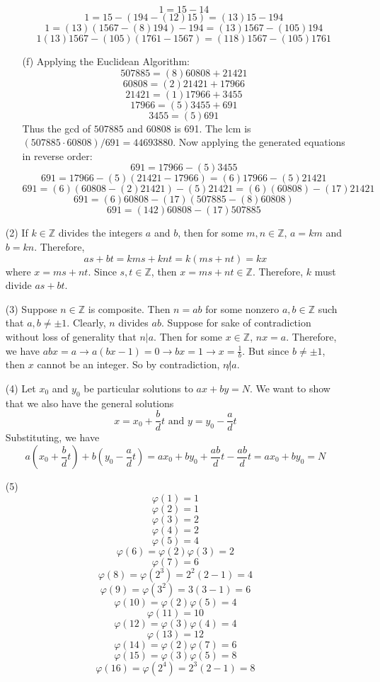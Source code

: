 \documentclass[12pt]{article}
\begin{document}
\begin{itemize}
\begin{itemize}
$$1 = 15 - 14$$
$$1 = 15 - (194 - (12)15) = (13)15 - 194$$
$$1 = (13)(1567 - (8)194) - 194 = (13)1567 - (105)194$$
$$1  (13)1567 - (105)(1761 - 1567) = (118)1567 - (105)1761$$
\item[(f)] Applying the Euclidean Algorithm:
$$507885 = (8)60808 + 21421$$
$$60808 = (2)21421 + 17966$$
$$21421 = (1)17966 + 3455$$
$$17966 = (5)3455 + 691$$
$$3455 = (5)691$$
Thus the gcd of $507885$ and $60808$ is 691. The lcm is $(507885 \cdot 60808) / 691 = 44693880$. Now applying the generated equations in reverse order:
$$691 = 17966 - (5)3455$$
$$691 = 17966 - (5)(21421 - 17966) = (6)17966 - (5)21421$$
$$691 = (6)(60808 - (2)21421) - (5)21421 = (6)(60808) - (17)21421$$
$$691 = (6)60808 - (17)(507885 - (8)60808)$$
$$691 = (142)60808 - (17)507885$$
\end{itemize}
\item[(2)]
If $k \in \mathbb{Z}$ divides the integers $a$ and $b$, then for some $m, n \in \mathbb{Z}$, $a = km$ and $b = kn$. Therefore,
$$as + bt = kms + knt = k(ms + nt) = kx$$
where $x = ms + nt$. Since $s, t \in \mathbb{Z}$, then $x = ms + nt \in \mathbb{Z}$. Therefore, $k$ must divide $as + bt$.
\item[(3)]
Suppose $n \in \mathbb{Z}$ is composite. Then $n = ab$ for some nonzero $a, b \in \mathbb{Z}$ such that $a, b \neq \pm 1$. Clearly, $n$ divides $ab$. Suppose for sake of contradiction without loss of generality that $n | a$. Then for some $x \in \mathbb{Z}$, $nx = a$. Therefore, we have $abx = a \rightarrow a(bx - 1) = 0 \rightarrow bx = 1 \rightarrow x = \frac{1}{b}$. But since $b \neq \pm 1$, then $x$ cannot be an integer. So by contradiction, $n \not | a$.
\item[(4)]
Let $x_0$ and $y_0$ be particular solutions to $ax + by = N$. We want to show that we also have the general solutions
$$x = x_0 + \frac{b}{d}t \text{ and } y = y_0 - \frac{a}{d}t$$
Substituting, we have
$$a\left(x_0 + \frac{b}{d}t\right) + b\left(y_0 - \frac{a}{d}t\right) = ax_0 + by_0 + \frac{ab}{d}t - \frac{ab}{d}t = ax_0 + by_0 = N$$
\item[(5)]
$$\varphi(1) = 1$$
$$\varphi(2) = 1$$
$$\varphi(3) = 2$$
$$\varphi(4) = 2$$
$$\varphi(5) = 4$$
$$\varphi(6) = \varphi(2)\varphi(3) = 2$$
$$\varphi(7) = 6$$
$$\varphi(8) = \varphi(2^3) = 2^2(2 - 1) = 4$$
$$\varphi(9) = \varphi(3^2) = 3(3 - 1) = 6$$
$$\varphi(10) = \varphi(2)\varphi(5) = 4$$
$$\varphi(11) = 10$$
$$\varphi(12) = \varphi(3)\varphi(4) = 4$$
$$\varphi(13) = 12$$
$$\varphi(14) = \varphi(2)\varphi(7) = 6$$
$$\varphi(15) = \varphi(3)\varphi(5) = 8$$
$$\varphi(16) = \varphi(2^4) = 2^3(2 - 1) = 8$$

\end{itemize}
\end{document}
